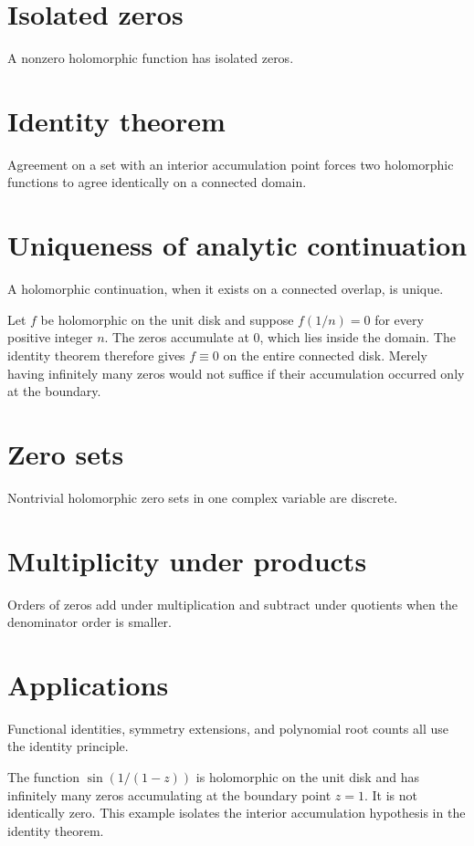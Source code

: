 \section{Isolated zeros}
A nonzero holomorphic function has isolated zeros.

\section{Identity theorem}
Agreement on a set with an interior accumulation point forces two holomorphic functions to agree identically on a connected domain.

\section{Uniqueness of analytic continuation}
A holomorphic continuation, when it exists on a connected overlap, is unique.

\begin{example}\label{ex:iv07-expand-02}
Let \(f\) be holomorphic on the unit disk and suppose \(f(1/n)=0\) for every positive integer \(n\). The zeros accumulate at \(0\), which lies inside the domain. The identity theorem therefore gives \(f\equiv0\) on the entire connected disk. Merely having infinitely many zeros would not suffice if their accumulation occurred only at the boundary.
\end{example}
\section{Zero sets}
Nontrivial holomorphic zero sets in one complex variable are discrete.

\section{Multiplicity under products}
Orders of zeros add under multiplication and subtract under quotients when the denominator order is smaller.

\section{Applications}
Functional identities, symmetry extensions, and polynomial root counts all use the identity principle.

\begin{example}\label{ex:iv07-expand-03}
The function \(\sin(1/(1-z))\) is holomorphic on the unit disk and has infinitely many zeros accumulating at the boundary point \(z=1\). It is not identically zero. This example isolates the interior accumulation hypothesis in the identity theorem.
\end{example}
